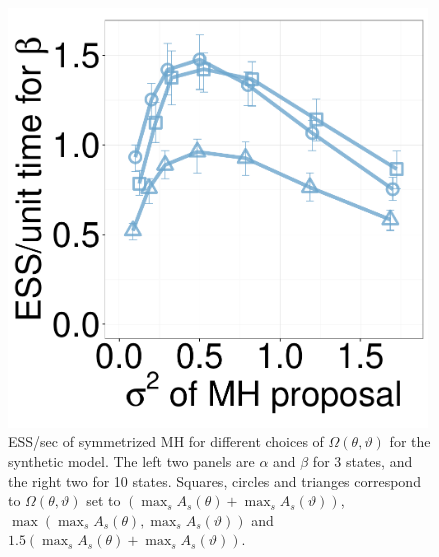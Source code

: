 \begin{figure}[H]
\begin{minipage}[hp]{0.24\linewidth}
	\end{minipage}
  \begin{minipage}[hp]{0.24\linewidth}
  \centering
    \includegraphics [width=0.99\textwidth, angle=0]{figs/new_whole_exp_figs/mh_exp_beta_dim10.pdf}
	\end{minipage}
    \caption{ESS/sec of symmetrized MH for different choices of $\Omega(\theta,\vartheta)$ for the synthetic model. The left two panels are $\alpha$ and $\beta$ for 3 states, and the right two for 10 states. Squares, circles and trianges correspond to $\Omega(\theta,\vartheta)$ set to $(\max_s A_s(\theta) + \max_s A_s(\vartheta))$, $\max(\max_s A_s(\theta), \max_s A_s(\vartheta))$ and  $1.5(\max_s A_s(\theta) + \max_s A_s(\vartheta))$.}
     \label{fig:mhESS_EXP}
  \end{figure}


